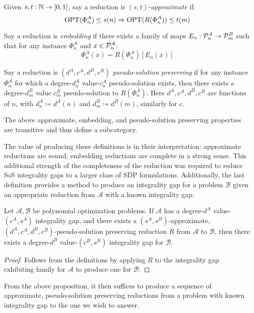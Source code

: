 \documentclass[runningheads,a4paper,english]{llncs}[2022/01/12]
\begin{document}
\begin{definition}
  Given $s, t : \mathbb{N} \to [0,1]$, say a reduction is $(s, t)$\emph{-approximate} if:
  \[\operatorname{OPT}(\Phi_n^A) \le s(n) \Rightarrow \operatorname{OPT}(R(\Phi_n^A)) \le t(m)\]
\end{definition}
\begin{definition}
  Say a reduction is \emph{embedding} if there exists a family of maps $E_n : \mathcal{P}_n^A \to \mathcal{P}_m^B$ such that for any instance $\Phi_n^A$ and $x \in \mathcal{P}_n^A$:
  \[\Phi_n^A(x) = R(\Phi_n^A)[E_n(x)]\]
\end{definition}
\begin{definition}
  Say a reduction is $(d^A, c^A, d^B, c^B)$ \emph{pseudo-solution preserving} if for any instance $\Phi_n^A$ for which a degree-$d_n^A$ value-$c_n^A$ pseudo-solution exists, then there exists a degree-$d_m^B$ value $c_m^B$ pseudo-solution to $R(\Phi_n^A)$. Here $d^A, c^A, d^B, c^B$ are functions of $n$, with $d_n^A \coloneq d^A(n)$ and $d_m^B \coloneq d^B(m)$, similarly for $c$.
\end{definition}
\begin{proposition}
  The above approximate, embedding, and pseudo-solution preserving properties are transitive and thus define a subcategory.
\end{proposition}
The value of producing these definitions is in their interpretation: approximate reductions are sound, embedding reductions are complete in a strong sense.
This additional strength of the completeness of the reduction was required to reduce SoS integrality gaps to a larger class of SDP formulations.
Additionally, the last definition provides a method to produce an integrality gap for a problem $\mathscr{B}$ given an appropriate reduction from $\mathscr{A}$ with a known integrality gap:
\begin{proposition}
  Let $\mathscr{A}, \mathscr{B}$ be polynomial optimization problems. If $\mathscr{A}$ has a degree-$d^A$ value-$(c^A, s^A)$ integrality gap, and there exists a $(s^A, s^B)$-approximate, $(d^A, c^A, d^B, c^B)$-pseudo-solution preserving reduction $R$ from $\mathscr{A}$ to $\mathscr{B}$, then there exists a degree-$d^B$ value-$(c^B, s^B)$ integrality gap for $\mathscr{B}$.
\end{proposition}
\begin{proof}
  Follows from the definitions by applying $R$ to the integrality gap exhibiting family for $\mathscr{A}$ to produce one for $\mathscr{B}$.
\end{proof}
From the above proposition, it then suffices to produce a sequence of approximate, pseudo-solution preserving reductions from a problem with known integrality gap to the one we wish to answer.
\end{document}
